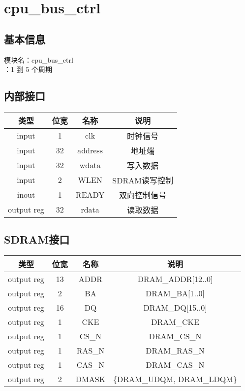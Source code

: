 \section{cpu\_bus\_ctrl}
\subsection{基本信息}
模块名：cpu\_bus\_ctrl\\
：1 到 5 个周期
\subsection{内部接口}
\begin{tabular}{|c|c|c|c|}
    \hline
    类型        &   位宽    &   名称    &   说明\\\hline
    input       &   1      &    clk     &   时钟信号\\\hline
    input       &   32     &    address &   地址端\\\hline
    input       &   32      &   wdata   &   写入数据\\\hline
    input       &   2       &   WLEN    &   SDRAM读写控制\\\hline
    inout       &   1       &   READY   &   双向控制信号\\\hline
    output reg  &   32      &   rdata   &   读取数据\\\hline
\end{tabular}
\subsection{SDRAM接口}
\begin{tabular}{|c|c|c|c|}
    \hline
    类型        &   位宽    &   名称    &   说明\\\hline
    output reg  &   13     &    ADDR   &    DRAM\_ADDR[12..0]\\\hline
    output reg  &   2       &   BA      &   DRAM\_BA[1..0]\\\hline
    output reg  &   16      &   DQ      &   DRAM\_DQ[15..0]\\\hline
    output reg  &   1       &   CKE     &   DRAM\_CKE\\\hline
    output reg  &   1       &   CS\_N     &   DRAM\_CS\_N\\\hline
    output reg  &   1       &   RAS\_N     &   DRAM\_RAS\_N\\\hline
    output reg  &   1       &   CAS\_N     &   DRAM\_CAS\_N\\\hline
    output reg  &   2       &   DMASK     &  \{DRAM\_UDQM, DRAM\_LDQM\}\\\hline
\end{tabular}
